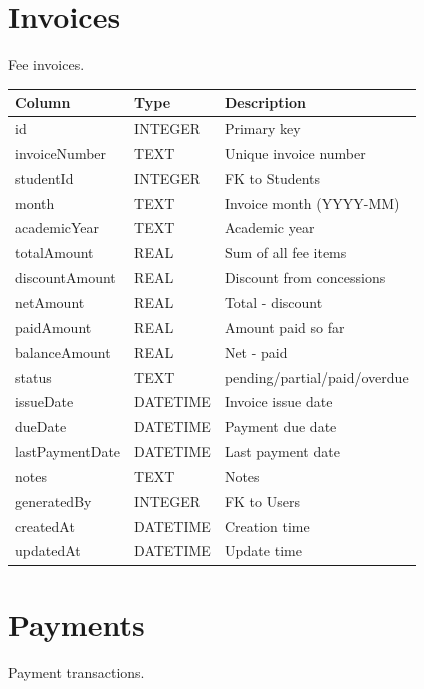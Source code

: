 \documentclass[12pt,a4paper]{report}
\begin{document}
\section{Invoices}

Fee invoices.

\begin{longtable}{@{}p{4cm}p{2.5cm}p{6.5cm}@{}}
\toprule
\textbf{Column} & \textbf{Type} & \textbf{Description} \\
\midrule
\endhead
id & INTEGER & Primary key \\
invoiceNumber & TEXT & Unique invoice number \\
studentId & INTEGER & FK to Students \\
month & TEXT & Invoice month (YYYY-MM) \\
academicYear & TEXT & Academic year \\
totalAmount & REAL & Sum of all fee items \\
discountAmount & REAL & Discount from concessions \\
netAmount & REAL & Total - discount \\
paidAmount & REAL & Amount paid so far \\
balanceAmount & REAL & Net - paid \\
status & TEXT & pending/partial/paid/overdue \\
issueDate & DATETIME & Invoice issue date \\
dueDate & DATETIME & Payment due date \\
lastPaymentDate & DATETIME & Last payment date \\
notes & TEXT & Notes \\
generatedBy & INTEGER & FK to Users \\
createdAt & DATETIME & Creation time \\
updatedAt & DATETIME & Update time \\
\bottomrule
\end{longtable}

\section{Payments}

Payment transactions.
\end{document}
